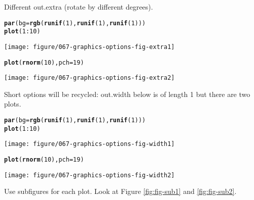 \documentclass{article}\usepackage[]{graphicx}\usepackage[]{color}
\makeatletter
\newcommand{\hlfunctioncall}[1]{\textcolor[rgb]{0.501960784313725,0,0.329411764705882}{\textbf{#1}}}%
\newenvironment{kframe}{%
 \def\at@end@of@kframe{}%
 \ifinner\ifhmode%
  \def\at@end@of@kframe{\end{minipage}}%
  \begin{minipage}{\columnwidth}%
 \fi\fi%
 \def\FrameCommand##1{\hskip\@totalleftmargin \hskip-\fboxsep
 \colorbox{shadecolor}{##1}\hskip-\fboxsep
     \hskip-\linewidth \hskip-\@totalleftmargin \hskip\columnwidth}%
 \MakeFramed {\advance\hsize-\width
   \@totalleftmargin\z@ \linewidth\hsize
   \@setminipage}}%
 {\par\unskip\endMakeFramed%
 \at@end@of@kframe}
\newenvironment{knitrout}{}{} %
\makeatother
\begin{document}
Different out.extra (rotate by different degrees).

\begin{knitrout}
\color{fgcolor}\begin{kframe}
\begin{alltt}
\hlfunctioncall{par}(bg = \hlfunctioncall{rgb}(\hlfunctioncall{runif}(1), \hlfunctioncall{runif}(1), \hlfunctioncall{runif}(1)))
\hlfunctioncall{plot}(1:10)
\end{alltt}
\end{kframe}
\texttt{[image: figure/067-graphics-options-fig-extra1]} 
\begin{kframe}\begin{alltt}
\hlfunctioncall{plot}(\hlfunctioncall{rnorm}(10), pch = 19)
\end{alltt}
\end{kframe}
\texttt{[image: figure/067-graphics-options-fig-extra2]} 

\end{knitrout}


Short options will be recycled: out.width below is of length 1 but there are two plots.

\begin{knitrout}
\color{fgcolor}\begin{kframe}
\begin{alltt}
\hlfunctioncall{par}(bg = \hlfunctioncall{rgb}(\hlfunctioncall{runif}(1), \hlfunctioncall{runif}(1), \hlfunctioncall{runif}(1)))
\hlfunctioncall{plot}(1:10)
\end{alltt}
\end{kframe}
\texttt{[image: figure/067-graphics-options-fig-width1]} 
\begin{kframe}\begin{alltt}
\hlfunctioncall{plot}(\hlfunctioncall{rnorm}(10), pch = 19)
\end{alltt}
\end{kframe}
\texttt{[image: figure/067-graphics-options-fig-width2]} 

\end{knitrout}


Use subfigures for each plot. Look at Figure \ref{fig:fig-sub1} and \ref{fig:fig-sub2}.
\end{document}
